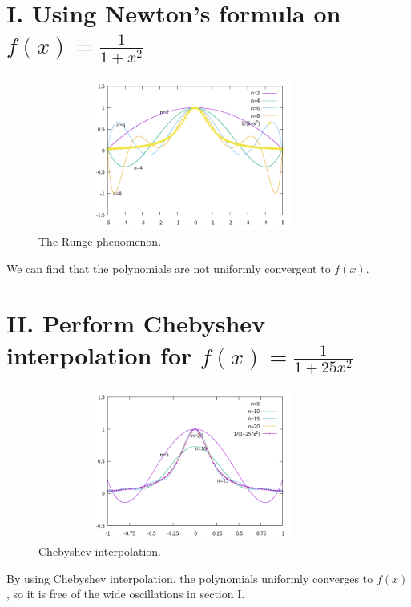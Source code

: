 \documentclass[twoside,a4paper]{article}
\begin{document}
\pagestyle{fancy}
\fancyhead{}


\section*{I. \small{Using Newton's formula on $f\left( x \right)=\frac{1}{1+x^2} $}}
\begin{figure}[h]
	\centering
	\includegraphics[width=10cm,height=5cm]{Plot1.png}
	\caption{The Runge phenomenon.}
\end{figure}
We can find that the polynomials are not uniformly convergent to $f(x)$.

\section*{II. \small{Perform Chebyshev interpolation for $f\left( x \right)=\frac{1}{1+25x^2} $}}

\begin{figure}[h]
        \centering
        \includegraphics[width=10cm,height=5cm]{Plot2.png}
        \caption{Chebyshev interpolation.}
\end{figure}

By using Chebyshev interpolation, the polynomials uniformly converges to $f(x)$
, so it is free of the wide oscillations in section I.
\end{document}
